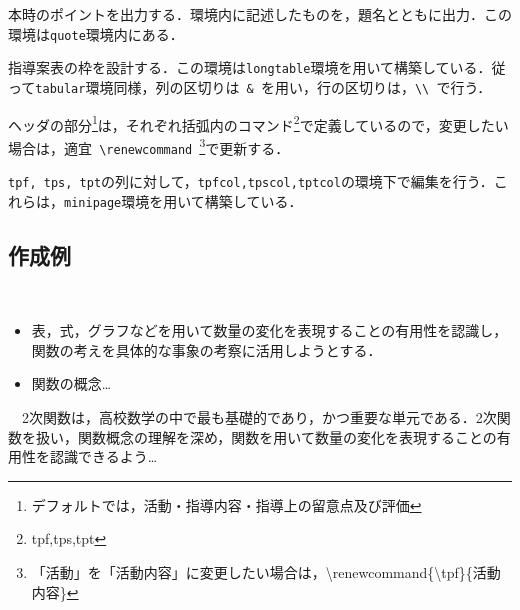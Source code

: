 \documentclass[paper=a4,fontsize=10.5pt]{jlreq}
\begin{document}
\par
本時のポイントを出力する．環境内に記述したものを，題名とともに出力．この環境は\verb|quote|環境内にある．\\
\noindent{}\par
指導案表の枠を設計する．この環境は\verb|longtable|環境を用いて構築している．従って\verb|tabular|環境同様，列の区切りは\verb| & |を用い，行の区切りは，\verb|\\ |で行う．\par
ヘッダの部分\footnote{デフォルトでは，活動・指導内容・指導上の留意点及び評価}は，それぞれ括弧内のコマンド\footnote{tpf,tps,tpt}で定義しているので，変更したい場合は，適宜\verb| \renewcommand |\footnote{「活動」を「活動内容」に変更したい場合は，{\ttfamily\textbackslash renewcommand\{\textbackslash tpf\}\{活動内容\}}}で更新する．\vspace{0.5em}\\
\par
\verb|tpf, tps, tpt|の列に対して，\verb|tpfcol,tpscol,tptcol|の環境下で編集を行う．これらは，\verb|minipage|環境を用いて構築している．\par
\newpage
\begin{leftbar}
    \section*{作成例}
\end{leftbar}
\\
\hrulefill\vspace{1em}
\begin{UnitGoals}
    \begin{itemize}
        \item 表，式，グラフなどを用いて数量の変化を表現することの有用性を認識し，関数の考えを具体的な事象の考察に活用しようとする．
        \item 関数の概念\dots
    \end{itemize}
\end{UnitGoals}
\begin{UnitView}
    \ \ 2次関数は，高校数学の中で最も基礎的であり，かつ重要な単元である．2次関数を扱い，関数概念の理解を深め，関数を用いて数量の変化を表現することの有用性を認識できるよう\dots
\end{UnitView}
\end{document}

